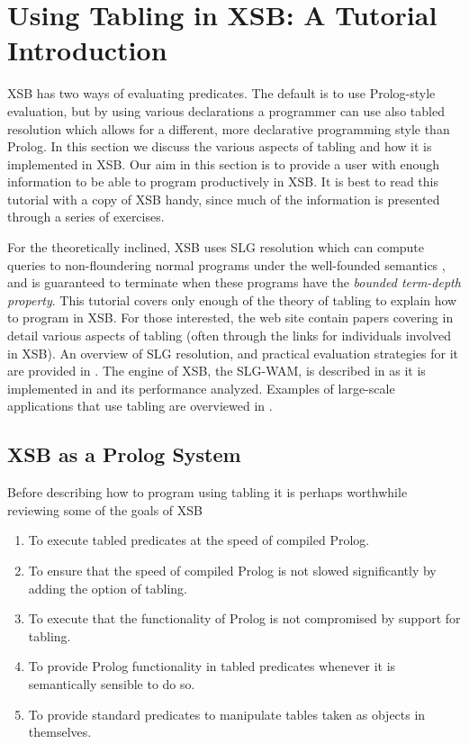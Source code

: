 
\newtheorem{exercise}{Exercise}[section]

\chapter{Using Tabling in XSB: A Tutorial Introduction} 
\label{tabling_overview}

XSB has two ways of evaluating predicates.  The default is to use
Prolog-style evaluation, but by using various declarations a
programmer can use also tabled resolution which allows for a
different, more declarative programming style than Prolog.  In this
section we discuss the various aspects of tabling and how it is
implemented in XSB.  Our aim in this section is to provide a user with
enough information to be able to program productively in XSB.  It is
best to read this tutorial with a copy of XSB handy, since much of the
information is presented through a series of exercises.

For the theoretically inclined, XSB uses SLG resolution which can
compute queries to non-floundering normal programs under the
well-founded semantics \cite{VGRS91}, and is guaranteed to terminate
when these programs have the {\em bounded term-depth property}.  This
tutorial covers only enough of the theory of tabling to explain how to
program in XSB.  For those interested, the web site contain papers
covering in detail various aspects of tabling (often through the links
for individuals involved in XSB).  An overview of SLG resolution, and
practical evaluation strategies for it are provided in
\cite{ChWa96,Swif99b,SaSW99,FSW98}.  The engine of XSB, the SLG-WAM,
is described in \cite{SaSw98,RRSSW98,JFLP-Scheduling, SaSW96,
ChSW95,CAT@PLILP-98} as it is implemented in \version{} and its
performance analyzed.  Examples of large-scale applications that use
tabling are overviewed in \cite{Swif99a,CoDS96,DRW96}.

\section{XSB as a Prolog System}\label{tabling_env}

Before describing how to program using tabling it is perhaps
worthwhile reviewing some of the goals of XSB 
\begin{enumerate}
\item	To execute tabled predicates at the speed of compiled Prolog.
\item	To ensure that the speed of compiled Prolog is not slowed
	significantly by adding the option of tabling.
\item	To execute that the functionality of Prolog is not compromised
 	by support for tabling.
\item	To provide Prolog functionality in tabled predicates 
	whenever it is semantically sensible to do so.
\item	To provide standard predicates to manipulate tables
	taken as objects in themselves.
\end{enumerate}

